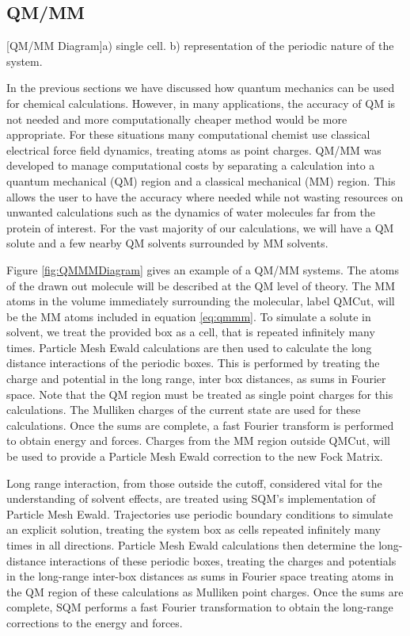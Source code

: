 \subsection{QM/MM}
	\begin{multiFigure} 
	[QM/MM Diagram]{a) single cell. b) representation of the periodic nature of the system.}
	\label{fig:QMMMDiagram}
	\end{multiFigure}
\bigskip

	In the previous sections we have discussed how quantum mechanics can be used for chemical calculations.
  However, in many applications, the accuracy of QM is not needed and more computationally cheaper method would be more appropriate.
	For these situations many computational chemist use classical electrical force field dynamics, treating atoms as point charges.
	QM/MM was developed to manage computational costs by separating a calculation into a quantum mechanical (QM) region and a classical mechanical (MM) region.\cite{warshel1976theoretical,Karplus2014}
	This allows the user to have the accuracy where needed while not wasting resources on unwanted calculations such as the dynamics of water molecules far from the protein of interest.
	For the vast majority of our calculations, we will have a QM solute and a few nearby QM solvents surrounded by MM solvents.

	Figure \ref{fig:QMMMDiagram} gives an example of a QM/MM systems.
	The atoms of the drawn out molecule will be described at the QM level of theory.
	The MM atoms in the volume immediately surrounding the molecular, label QMCut, will be the MM atoms included in equation \ref{eq:qmmm}.
	To simulate a solute in solvent, we treat the provided box as a cell, that is repeated infinitely many times.
	Particle Mesh Ewald calculations are then used to calculate the long distance interactions of the periodic boxes.
	This is performed by treating the charge and potential in the long range, inter box distances, as sums in Fourier space.\cite{Darden1993}
	Note that the QM region must be treated as single point charges for this calculations.
	The Mulliken charges of the current state are used for these calculations.
	Once the sums are complete, a fast Fourier transform is performed to obtain energy and forces.
	Charges from the MM region outside QMCut, will be used to provide a Particle Mesh Ewald correction to the new Fock Matrix.\cite{Walker2008}

	Long range interaction, from those outside the cutoff, considered vital for the understanding of solvent effects, are treated using SQM’s implementation of Particle Mesh Ewald.
	Trajectories use periodic boundary conditions to simulate an explicit solution, treating the system box as cells repeated infinitely many times in all directions.
	Particle Mesh Ewald calculations then determine the long-distance interactions of these periodic boxes, treating the charges and potentials in the long-range inter-box distances as sums in Fourier space treating atoms in the QM region of these calculations as Mulliken point charges.
	Once the sums are complete, SQM performs a fast Fourier transformation to obtain the long-range corrections to the energy and forces.

